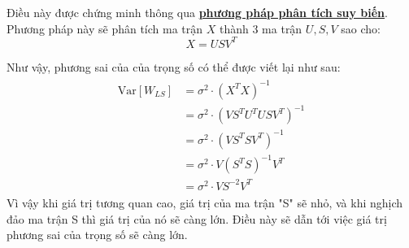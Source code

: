 \documentclass{report}
\begin{document}
    Điều này được chứng minh thông qua \href{https://www.kaggle.com/code/phamdinhkhanh/singular-value-decomposition}{\textbf{phương pháp phân tích suy biến}}. Phương pháp này sẽ phân tích ma trận $X$ thành 3 ma trận $U, S, V$ sao cho:
        \begin{equation}
            X = U S V^T
        \end{equation}
    
    Như vậy, phương sai của của trọng số có thể  được viết lại như sau:
    \begin{align*}
        \begin{split}    
        \text{Var}[W_{LS}] &= \sigma^2 \cdot (X^T X)^{-1} \\
                            &= \sigma^2 \cdot (V S^T U^T U S V^T)^{-1} \\
                            &= \sigma^2 \cdot (V S^T S V^T)^{-1} \\
                            &= \sigma^2 \cdot V (S^T S)^{-1} V^T\\
                            &= \sigma^2 \cdot V S^{-2} V^T
        \end{split}
    \end{align*}
    Vì vậy khi giá trị tương quan cao, giá trị của ma trận "S" sẽ nhỏ, và khi nghịch đảo ma trận S thì giá trị của nó sẽ càng lớn. Điều này sẽ dẫn tới việc giá trị phương sai của trọng số sẽ càng lớn.   
    \\
\end{document}
